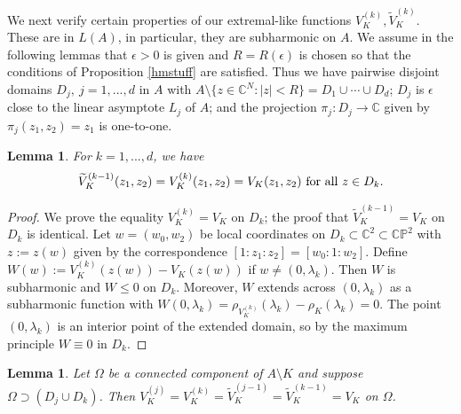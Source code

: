 \documentclass[12pt]{article}
\numberwithin{equation}{section}
\newtheorem{lemma}[theorem]{Lemma}
\newcommand{\C}{\mathbb{C}}
\newcommand{\PP}{\mathbb P}
\renewcommand{\tilde}{\widetilde}
\begin{document}
We next verify certain properties of our extremal-like functions $V_K^{(k)}, \tilde V_K^{(k)}$. These are in $L(A)$, in particular, they are subharmonic on $A$. We assume in the following lemmas that $\epsilon >0$ is given and $R=R(\epsilon)$ is chosen so that the conditions of Proposition \ref{hmstuff} are satisfied. Thus we have pairwise disjoint domains $D_j, \ j=1,...,d$ in $A$ with $A\setminus \{z\in \C^N: |z|< R\}=D_1\cup \cdots \cup D_d$; $D_j$ is $\epsilon$ close to the linear asymptote $L_j$ of $A$; and the projection $\pi_j: D_j \to \C$ given by $\pi_j(z_1,z_2)=z_1$ is one-to-one. 

\begin{lemma}
For $k=1,...,d$, we have 
\begin{equation}\label{Vk=V}
\tilde V_K^{(k-1)}(z_1,z_2)=V_K^{(k)}(z_1,z_2) = V_K(z_1,z_2) \hbox{ for all } z\in D_k.
\end{equation}
\end{lemma}

\begin{proof} We prove the equality $V_K^{(k)} = V_K$ on $D_k$; the proof that $\tilde V_K^{(k-1)} = V_K$ on $D_k$ is identical. 
Let $w=(w_0,w_2)$ be local coordinates on $D_k\subset\C^2\subset\C\PP^2$  with $z:=z(w)$ given by the correspondence $[1:z_1:z_2]=[w_0:1:w_2]$. Define 
$W(w) := V_K^{(k)}(z(w))-V_K(z(w))$ if $w\neq (0,\lambda_k)$.  Then $W$ is subharmonic and $W\leq 0$ on $D_k$. Moreover, $W$ extends across $(0,\lambda_k)$ as a subharmonic function with 
$W(0,\lambda_k)=\rho_{V_K^{(k)}}(\lambda_k)-\rho_{K}(\lambda_k)= 0$.  The point $(0,\lambda_k)$ is an interior point of the extended domain, so by the maximum principle $W\equiv 0$ in $D_k$.
\end{proof}


\begin{lemma} \label{kjequal}
Let $\Omega$ be a connected component of $A\setminus K$ and suppose $\Omega\supset (D_j\cup D_k)$.  Then $V_K^{(j)}=V_K^{(k)}=\tilde V_K^{(j-1)}=\tilde V_K^{(k-1)}=V_K$ on $\Omega$.  
\end{lemma}
\end{document}
